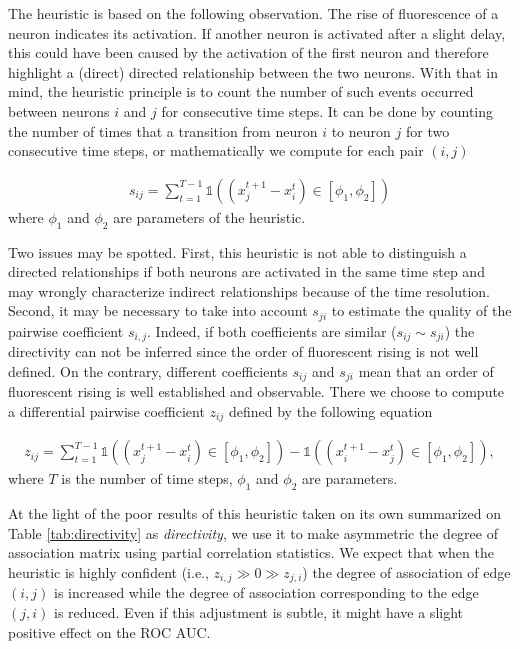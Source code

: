 \documentclass[wcp]{jmlr}
\begin{document}
The heuristic is based on the following observation. The rise of fluorescence
of a neuron indicates its activation. If another neuron is activated after a
slight delay, this could have been caused by the activation of the first
neuron and therefore highlight a (direct) directed relationship between the
two neurons. With that in mind, the heuristic principle is to count the number
of such events occurred between neurons $i$ and $j$ for consecutive time
steps. It can be done by counting the number of times that a transition from
neuron $i$ to neuron $j$ for two consecutive time steps, or mathematically we
compute for each pair $(i,j)$

\begin{align}
s_{ij} = \sum_{t=1}^{T - 1} \mathbb{1}((x_j^{t+1} - x_i^t) \in \left[\phi_1, \phi_2\right])
\end{align}
where $\phi_1$ and $\phi_2$ are parameters of the heuristic.

Two issues may be spotted. First, this heuristic is not able to distinguish a
directed relationships if both neurons are activated in the same time step and
may wrongly characterize indirect relationships because of the time
resolution. Second, it may be necessary to take into account $s_{ji}$ to
estimate the quality of the pairwise coefficient $s_{i,j}$. Indeed, if both
coefficients are similar ($s_{ij} \sim s_{ji}$) the directivity can not be
inferred since the order of fluorescent rising is not well defined. On the
contrary, different coefficients $s_{ij}$ and $s_{ji}$ mean that an order of
fluorescent rising is well established and observable. There we choose to
compute a differential pairwise coefficient $z_{ij}$ defined by the following
equation


\begin{align}
z_{ij} = \sum_{t=1}^{T - 1}
    \mathbb{1}((x_j^{t+1} - x_i^t) \in \left[\phi_1, \phi_2 \right]) -
    \mathbb{1}((x_i^{t+1} - x_j^t) \in \left[\phi_1, \phi_2 \right]),
\end{align}
where $T$ is the number of time steps, $\phi_1$ and $\phi_2$ are parameters.

At the light of the poor results of this heuristic taken on its own summarized
on Table \ref{tab:directivity} as \textit{directivity}, we use it to make asymmetric the
degree of association matrix using partial correlation statistics. We expect
that when the heuristic is highly confident (i.e., $z_{i,j} \gg 0 \gg
z_{j,i}$) the degree of association   of edge $(i,j)$ is increased while the
degree of association corresponding to the edge $(j,i)$ is reduced. Even if
this adjustment is subtle, it might have a slight positive effect on the ROC
AUC.
\end{document}
